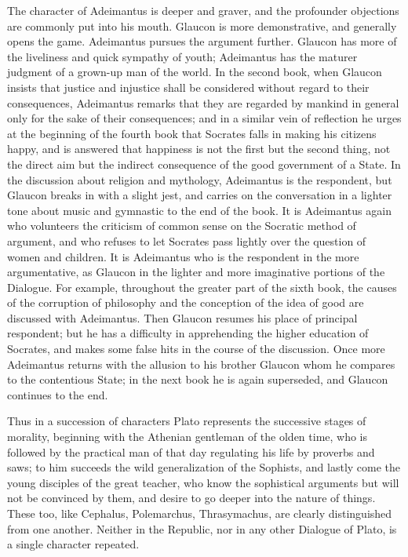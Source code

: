 The character of Adeimantus is deeper and graver, and the profounder objections are commonly put into his mouth. Glaucon is more demonstrative, and generally opens the game. Adeimantus pursues the argument further. Glaucon has more of the liveliness and quick sympathy of youth; Adeimantus has the maturer judgment of a grown-up man of the world. In the second book, when Glaucon insists that justice and injustice shall be considered without regard to their consequences, Adeimantus remarks that they are regarded by mankind in general only for the sake of their consequences; and in a similar vein of reflection he urges at the beginning of the fourth book that Socrates falls in making his citizens happy, and is answered that happiness is not the first but the second thing, not the direct aim but the indirect consequence of the good government of a State. In the discussion about religion and mythology, Adeimantus is the respondent, but Glaucon breaks in with a slight jest, and carries on the conversation in a lighter tone about music and gymnastic to the end of the book. It is Adeimantus again who volunteers the criticism of common sense on the Socratic method of argument, and who refuses to let Socrates pass lightly over the question of women and children. It is Adeimantus who is the respondent in the more argumentative, as Glaucon in the lighter and more imaginative portions of the Dialogue. For example, throughout the greater part of the sixth book, the causes of the corruption of philosophy and the conception of the idea of good are discussed with Adeimantus. Then Glaucon resumes his place of principal respondent; but he has a difficulty in apprehending the higher education of Socrates, and makes some false hits in the course of the discussion. Once more Adeimantus returns with the allusion to his brother Glaucon whom he compares to the contentious State; in the next book he is again superseded, and Glaucon continues to the end.

Thus in a succession of characters Plato represents the successive stages of morality, beginning with the Athenian gentleman of the olden time, who is followed by the practical man of that day regulating his life by proverbs and saws; to him succeeds the wild generalization of the Sophists, and lastly come the young disciples of the great teacher, who know the sophistical arguments but will not be convinced by them, and desire to go deeper into the nature of things. These too, like Cephalus, Polemarchus, Thrasymachus, are clearly distinguished from one another. Neither in the Republic, nor in any other Dialogue of Plato, is a single character repeated.

